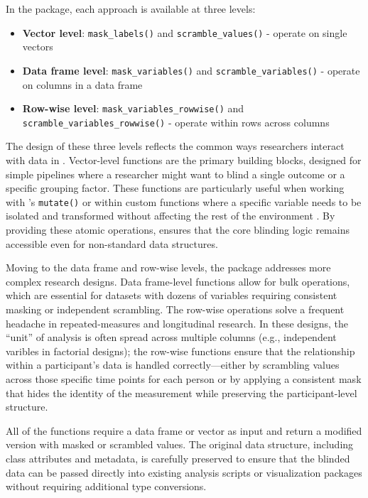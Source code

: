 \documentclass[
]{jss}
\providecommand{\tightlist}{%
  \setlength{\itemsep}{0pt}\setlength{\parskip}{0pt}}
\begin{document}
In the  package, each approach is available at three levels:

\begin{itemize}
\tightlist
\item
  \textbf{Vector level}: \texttt{mask\_labels()} and
  \texttt{scramble\_values()} - operate on single vectors
\item
  \textbf{Data frame level}: \texttt{mask\_variables()} and
  \texttt{scramble\_variables()} - operate on columns in a data frame
\item
  \textbf{Row-wise level}: \texttt{mask\_variables\_rowwise()} and
  \texttt{scramble\_variables\_rowwise()} - operate within rows across
  columns
\end{itemize}

The design of these three levels reflects the common ways researchers
interact with data in . Vector-level functions are the
primary building blocks, designed for simple pipelines where a
researcher might want to blind a single outcome or a specific grouping
factor. These functions are particularly useful when working with
's \texttt{mutate()} or within custom functions where a
specific variable needs to be isolated and transformed without affecting
the rest of the environment \citep{Wickham2025-eh}. By providing these
atomic operations,  ensures that the core blinding logic
remains accessible even for non-standard data structures.

Moving to the data frame and row-wise levels, the package addresses more
complex research designs. Data frame-level functions allow for bulk
operations, which are essential for datasets with dozens of variables
requiring consistent masking or independent scrambling. The row-wise
operations solve a frequent headache in repeated-measures and
longitudinal research. In these designs, the ``unit'' of analysis is
often spread across multiple columns (e.g., independent varibles in
factorial designs); the row-wise functions ensure that the relationship
within a participant's data is handled correctly---either by scrambling
values across those specific time points for each person or by applying
a consistent mask that hides the identity of the measurement while
preserving the participant-level structure.

All of the functions require a data frame or vector as input and return
a modified version with masked or scrambled values. The original data
structure, including class attributes and metadata, is carefully
preserved to ensure that the blinded data can be passed directly into
existing analysis scripts or visualization packages without requiring
additional type conversions.
\end{document}
